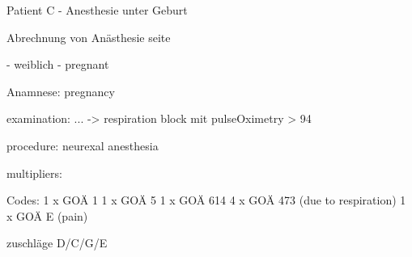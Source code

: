 Patient C - Anesthesie unter Geburt

Abrechnung von Anästhesie seite

- weiblich
- pregnant

Anamnese:
pregnancy


examination:
...
-> respiration block mit pulseOximetry > 94

procedure:
neurexal anesthesia

multipliers:


Codes:
1 x GOÄ 1
1 x GOÄ 5
1 x GOÄ 614
4 x GOÄ 473 (due to respiration)
1 x GOÄ E (pain)

zuschläge D/C/G/E


